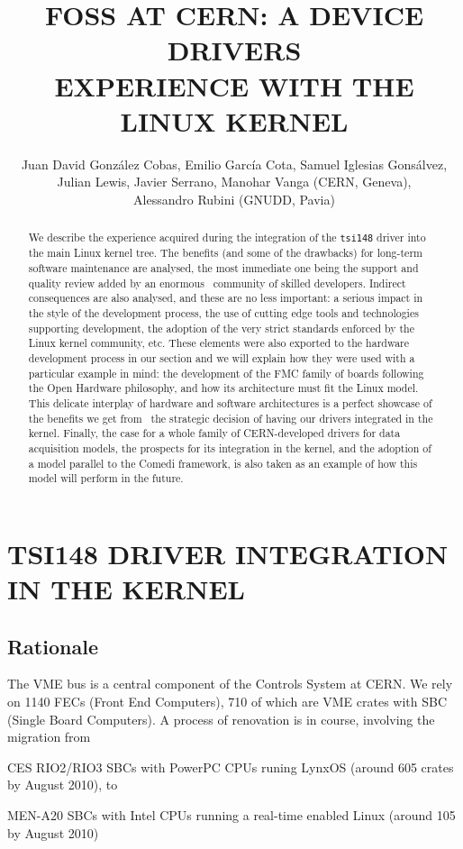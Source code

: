 \documentclass{JAC2003}
\title{FOSS AT CERN: A DEVICE DRIVERS\\
	EXPERIENCE WITH THE LINUX KERNEL}
\author{%
	Juan David Gonz\'alez Cobas, Emilio Garc\'ia Cota,
	Samuel Iglesias Gons\'alvez,\\
	Julian Lewis, Javier Serrano, Manohar Vanga (CERN, Geneva),\\ 
	Alessandro Rubini (GNUDD, Pavia)}
\begin{document}
\maketitle
\begin{abstract}
    We describe the experience acquired during the integration of the
    \texttt{tsi148} driver
    into the main Linux kernel tree. The benefits (and some of the drawbacks) for
    long-term software maintenance are analysed, the most immediate one being the
    support and quality review added by an enormous  community of skilled
    developers. Indirect consequences are also analysed, and these are no less
    important: a serious impact in the style of the development process, the use of
    cutting edge tools and technologies supporting development, the adoption of the
    very strict standards enforced by the Linux kernel community, etc. These
    elements were also exported to the hardware development process in our section
    and we will explain how they were used with a particular example in mind: the
    development of the FMC family of boards following the Open Hardware philosophy,
    and how its architecture must fit the Linux model. This delicate interplay of
    hardware and software architectures is a perfect showcase of the benefits we
    get from  the strategic decision of having our drivers integrated in the
    kernel.  Finally, the case for a whole family of CERN-developed drivers for
    data acquisition models, the prospects for its integration in the kernel, and
    the adoption of a model parallel to the Comedi framework, is also
    taken as an example of how this model will perform in the future.
\end{abstract}


\section{TSI148 DRIVER INTEGRATION IN THE KERNEL}
\subsection{Rationale}
The VME bus is a central component of the Controls System at CERN. We 
rely on 1140 FECs (Front End Computers), 710 of which are VME crates
with SBC (Single Board Computers). A process of renovation is in course,
involving the migration from 
\begin{Itemize}
\item CES RIO2/RIO3 SBCs with PowerPC CPUs runing LynxOS (around 605
    crates by August 2010), to
\item MEN-A20 SBCs with Intel CPUs running  a real-time enabled Linux
    (around 105 by August 2010)
\end{Itemize}
\end{document}
